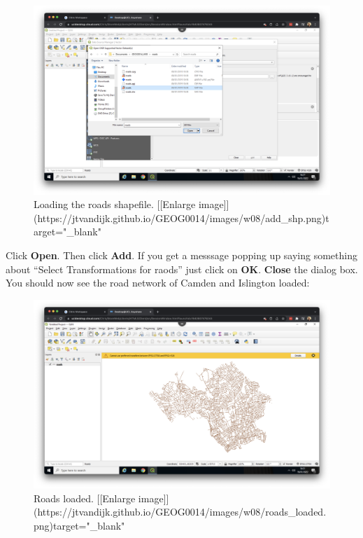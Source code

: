 \documentclass[
]{book}
\begin{document}
\begin{figure}

{\centering \includegraphics[width=850pt]{images/w08/add_shp} 

}

\caption{Loading the roads shapefile. [[Enlarge image]](https://jtvandijk.github.io/GEOG0014/images/w08/add_shp.png){target="_blank"}}\label{fig:add-shp}
\end{figure}

Click \textbf{Open}. Then click \textbf{Add}. If you get a messsage popping up saying something about ``Select Transformations for raods'' just click on \textbf{OK}. \textbf{Close} the dialog box. You should now see the road network of Camden and Islington loaded:

\begin{figure}

{\centering \includegraphics[width=850pt]{images/w08/roads_loaded} 

}

\caption{Roads loaded. [[Enlarge image]](https://jtvandijk.github.io/GEOG0014/images/w08/roads_loaded.png){target="_blank"}}\label{fig:roads-loaded}
\end{figure}
\end{document}
